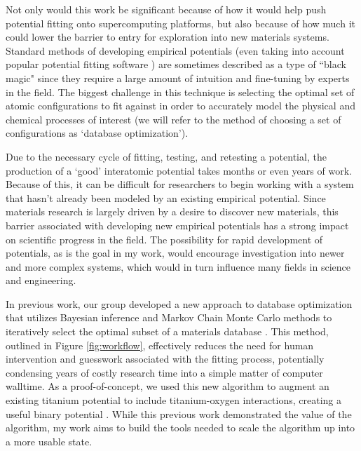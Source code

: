 \documentclass[11pt]{article}
\begin{document}

Not only would this work be significant because of how it would help push potential fitting onto supercomputing platforms, but also because of how much it could lower the barrier to entry for exploration into new materials systems. Standard methods of developing empirical potentials (even taking into account popular potential fitting software \cite{potfit}) are sometimes described as a type of ``black magic" since they require a large amount of intuition and fine-tuning by experts in the field. The biggest challenge in this technique is selecting the optimal set of atomic configurations to fit against in order to accurately model the physical and chemical processes of interest (we will refer to the method of choosing a set of configurations as `database optimization').

Due to the necessary cycle of fitting, testing, and retesting a potential, the production of a `good' interatomic potential takes months or even years of work. Because of this, it can be difficult for researchers to begin working with a system that hasn't already been modeled by an existing empirical potential. Since materials research is largely driven by a desire to discover new materials, this barrier associated with developing new empirical potentials has a strong impact on scientific progress in the field. The possibility for rapid development of potentials, as is the goal in my work, would encourage investigation into newer and more complex systems, which would in turn influence many fields in science and engineering.


In previous work, our group developed a new approach to database optimization that utilizes Bayesian inference \cite{baye} and Markov Chain Monte Carlo methods to iteratively select the optimal subset of a materials database \cite{dbopt}. This method, outlined in Figure \ref{fig:workflow}, effectively reduces the need for human intervention and guesswork associated with the fitting process, potentially condensing years of costly research time into a simple matter of computer walltime. As a proof-of-concept, we used this new algorithm to augment an existing titanium potential to include titanium-oxygen interactions, creating a useful binary potential \cite{tio}. While this previous work demonstrated the value of the algorithm, my work aims to build the tools needed to scale the algorithm up into a more usable state.
\end{document}
